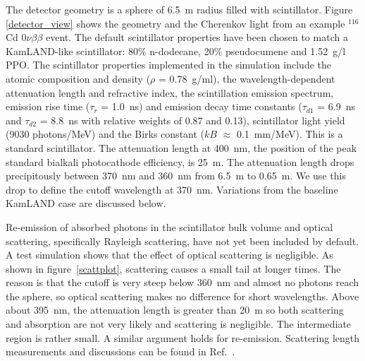 \documentclass[cits]{JINST}
\begin{document}
The detector geometry is a sphere of 6.5~m radius filled with
scintillator. Figure \ref{detector_view} shows the geometry and the
Cherenkov light from an example $^{116}$Cd $0\nu\beta\beta$ event. The
default scintillator properties have been chosen to match a KamLAND-like
scintillator\cite{kamland2003}: 80\% n-dodecane, 20\% pseudocumene and 1.52~g/l PPO. The
scintillator properties implemented in the simulation include the
atomic composition and density ($\rho$ = 0.78~g/ml), the
wavelength-dependent attenuation length\cite{tajimaMaster} and
refractive index\cite{OlegThesis}, the scintillation emission
spectrum\cite{tajimaMaster}, emission rise time ($\tau_r$ = 1.0~ns)
and emission decay time constants ($\tau_{d1}$ = 6.9~ns and
$\tau_{d2}$ = 8.8~ns with relative weights of 0.87 and 
0.13)\cite{tajimaThesis}, scintillator light yield (9030 photons/MeV)
and the Birks constant ($kB$ $\approx$ 0.1~mm/MeV)\cite{ChrisThesis}.  This is a standard scintillator. The attenuation length at 400~nm, the position of the peak standard bialkali photocathode efficiency, is 25~m. The attenuation length drops precipitously between 370~nm and 360~nm from 6.5~m to 0.65~m. We use this drop to define the cutoff wavelength at 370~nm. Variations from the baseline KamLAND case are discussed below. 

Re-emission of absorbed photons in the scintillator
bulk volume and optical scattering, specifically Rayleigh scattering, have not yet been included by default. A test simulation shows that the effect of optical scattering is negligible. As shown in figure~\ref{scattplot}, scattering causes a small tail at longer times. The reason is that the cutoff is very steep below 360~nm and almost no photons reach the sphere, so optical scattering makes no difference for short wavelengths. Above about 395~nm, the attenuation length is greater than 20~m so both scattering and absorption are not very likely and scattering is negligible. The intermediate region is rather small. A similar argument holds for re-emission. Scattering length measurements and discussions can be found in Ref.~\cite{Wurm:2010ad}. 
\end{document}
